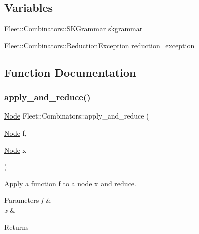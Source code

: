 \subsection*{Variables}
\begin{DoxyCompactItemize}
\item 
\hyperlink{class_fleet_1_1_combinators_1_1_s_k_grammar}{Fleet\+::\+Combinators\+::\+S\+K\+Grammar} \hyperlink{namespace_fleet_1_1_combinators_a5293b7a2dcdbfb430b45fcf401e3bab0}{skgrammar}
\item 
\hyperlink{class_fleet_1_1_combinators_1_1_reduction_exception}{Fleet\+::\+Combinators\+::\+Reduction\+Exception} \hyperlink{namespace_fleet_1_1_combinators_a837dab8d754d0f5062bf633738832079}{reduction\+\_\+exception}
\end{DoxyCompactItemize}


\subsection{Function Documentation}
\mbox{\label{namespace_fleet_1_1_combinators_a8c5491d5248a57dfe08a4f730ab53fbd}} 
\subsubsection{\texorpdfstring{apply\+\_\+and\+\_\+reduce()}{apply\_and\_reduce()}}
{\footnotesize\ttfamily \hyperlink{class_node}{Node} Fleet\+::\+Combinators\+::apply\+\_\+and\+\_\+reduce (\begin{DoxyParamCaption}\item[{\hyperlink{class_node}{Node}}]{f,  }\item[{\hyperlink{class_node}{Node}}]{x }\end{DoxyParamCaption})}



Apply a function f to a node x and reduce. 


\begin{DoxyParams}{Parameters}
{\em f} & \\
\hline
{\em x} & \\
\hline
\end{DoxyParams}
\begin{DoxyReturn}{Returns}

\end{DoxyReturn}
\mbox{\label{namespace_fleet_1_1_combinators_a3d456e1f1eeb0569b962e4ddb521c64a}} 
